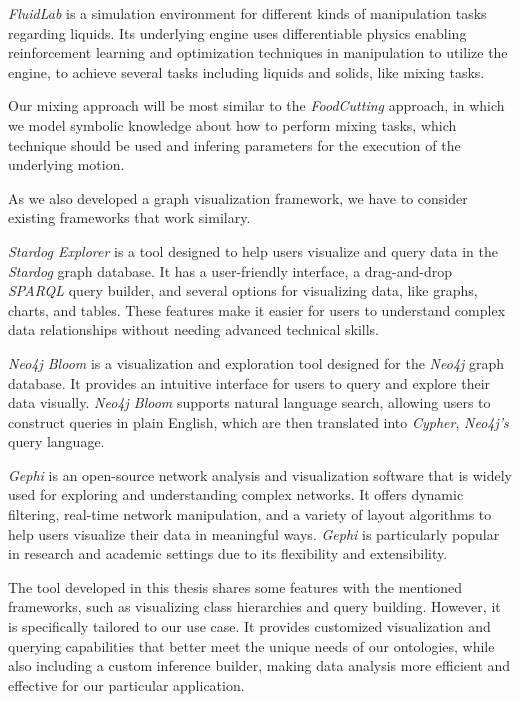 \textit{FluidLab} \cite{xian2023fluidlab} is a simulation environment for different kinds of manipulation tasks regarding liquids. Its underlying engine uses differentiable physics 
enabling reinforcement learning and optimization techniques in manipulation to utilize the engine, to achieve several tasks 
including liquids and solids, like mixing tasks. 

Our mixing approach will be most similar to the \textit{FoodCutting} approach, in which we model symbolic knowledge about how to perform
mixing tasks, which technique should be used and infering parameters for the execution of the underlying motion.

As we also developed a graph visualization framework, we have to consider existing frameworks that work similary.

\textit{Stardog Explorer} \cite{StardogExplorer} is a tool designed to help users visualize and query data in the \textit{Stardog} graph database. It has a user-friendly interface, a drag-and-drop \textit{SPARQL} query builder, and several options for visualizing data, like graphs, charts, and tables. These features make it easier for users to understand complex data relationships without needing advanced technical skills.

\textit{Neo4j Bloom} \cite{neo4j} is a visualization and exploration tool designed for the \textit{Neo4j} graph database. It provides an intuitive interface for users to query and explore their data visually. \textit{Neo4j Bloom} \cite{neo4j} supports natural language search, allowing users to construct queries in plain English, which are then translated into \textit{Cypher}, \textit{Neo4j's} query language.

\textit{Gephi} \cite{gephi} is an open-source network analysis and visualization software that is widely used for exploring and understanding complex networks. It offers dynamic filtering, real-time network manipulation, and a variety of layout algorithms to help users visualize their data in meaningful ways. \textit{Gephi} \cite{gephi} is particularly popular in research and academic settings due to its flexibility and extensibility.

The tool developed in this thesis shares some features with the mentioned frameworks, such as visualizing class hierarchies and query building. However, it is specifically tailored to our use case. It provides customized visualization and querying capabilities that better meet the unique needs of our ontologies, while also including a custom inference builder, making data analysis more efficient and effective for our particular application.